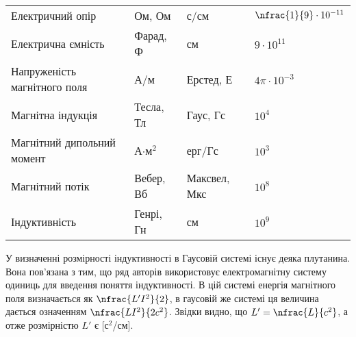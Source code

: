 \begin{table}[h!]
\begin{tabular}{M{6.5cm}M{4cm}M{3.5cm}l}
		Електричний опір               & Ом, Ом        & с/см                     & $\nfrac{1}{9} \cdot 10^{-11}$ \\
		Електрична ємність             & Фарад, Ф      & см                       & $9 \cdot 10^{11}$             \\
		Напруженість магнітного поля   & А/м           & Ерстед, Е                & $4\pi\cdot 10^{-3}$           \\
		Магнітна індукція              & Тесла, Тл     & Гаус, Гс                 & $10^{4}$                      \\
		Магнітний дипольний момент     & А$\cdot$м$^2$ & ерг/Гс                   & $10^{3}$                      \\
		Магнітний потік                & Вебер, Вб     & Максвел, Мкс             & $10^{8}$                      \\
		Індуктивність                  & Генрі, Гн     & см                       & $10^{9}$                      \\ \bottomrule
	\end{tabular}
\end{table}

У визначенні розмірності індуктивності в Гаусовій системі існує деяка плутанина. Вона пов'язана з тим, що ряд авторів використовує електромагнітну систему одиниць для введення поняття індуктивності. В цій системі енергія магнітного поля визначається як $\nfrac{L'I^2}{2}$, в гаусовій же системі ця величина дається означенням $\nfrac{LI^2}{2c^2}$. Звідки  видно, що $L' = \nfrac{L}{c^2}$, а отже розмірністю $L'$ є [с$^2$/см].
